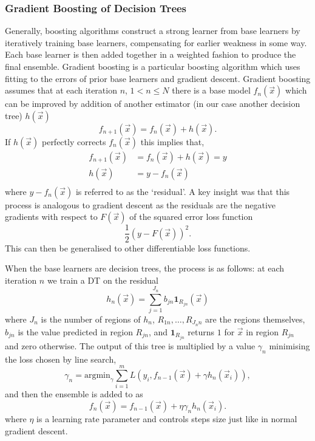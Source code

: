 \subsubsection{Gradient Boosting of Decision Trees}
Generally, boosting algorithms \cite{Boosting} construct a strong learner from base learners by iteratively training base learners, compensating for earlier weakness in some way. Each base learner is then added together in a weighted fashion to produce the final ensemble.
Gradient boosting \cite{GradientBoosting} is a particular boosting algorithm which uses fitting to the errors of prior base learners and gradient descent. Gradient boosting assumes that at each iteration $n$, $1<n\leq{N}$ there is a base model $f_{n}(\vec{x})$ which can be improved by addition of another estimator (in our case another decision tree) $h(\vec{x})$
\begin{equation}
    f_{n+1}(\vec{x}) = f_{n}(\vec{x}) + h(\vec{x}).
\end{equation}
If $h(\vec{x})$ perfectly corrects $f_{n}(\vec{x})$ this implies that,
\begin{equation}
    \begin{split}
        f_{n+1}(\vec{x}) &= f_{n}(\vec{x}) + h(\vec{x}) = y \\
        h(\vec{x}) &= y - f_{n}(\vec{x}) \\
    \end{split}
\end{equation}
where $y - f_{n}(\vec{x})$ is referred to as the `residual'. A key insight was that this process is analogous to gradient descent as the residuals are the negative gradients with respect to $F(\vec{x})$ of the squared error loss function
\begin{equation}
    \frac{1}{2}(y-F(\vec{x}))^{2}.
\end{equation}
This can then be generalised to other differentiable loss functions. 

When the base learners are decision trees, the process is as follows: at each iteration $n$ we train a DT on the residual 
\begin{equation}
    h_{n}(\vec{x}) = \sum_{j=1}^{J_{n}}b_{jn}\mathbf{1}_{R_{jn}}(\vec{x})
\end{equation}
where $J_n$ is the number of regions of $h_{n}$, $R_{1n},\dots,R_{J_{n}n}$ are the regions themselves, $b_{jn}$ is the value predicted in region $R_{jn}$, and $\mathbf{1}_{R_{jn}}$ returns $1$ for $\vec{x}$ in region $R_{jn}$ and zero otherwise. 
The output of this tree is multiplied by a value $\gamma_{n}$ minimising the loss chosen by line search,
\begin{equation}
    \gamma_{n} = \mathrm{argmin}_{\gamma}\sum_{i=1}^{m}L(y_{i},f_{n-1}(\vec{x})+\gamma{}h_{n}(\vec{x}_{i})),
\end{equation}
and then the ensemble is added to as
\begin{equation}
    f_{n}(\vec{x}) = f_{n-1}(\vec{x}) +\eta\gamma_{n}h_{n}(\vec{x}_{i}).
\end{equation}
where $\eta$ is a learning rate parameter and controls steps size just like in normal gradient descent. 




